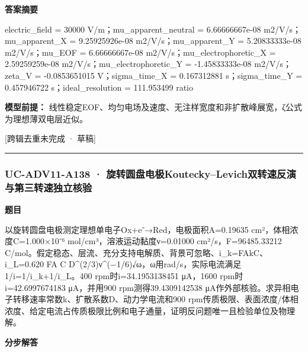 \documentclass[UTF8,11pt,a4paper]{ctexart}
\begin{document}
\noindent\textbf{答案摘要}\par
electric\_field = 30000 V/m；mu\_apparent\_neutral = 6.66666667e-08 m2/V/s；mu\_apparent\_X = 9.25925926e-08 m2/V/s；mu\_apparent\_Y = 5.20833333e-08 m2/V/s；mu\_EOF = 6.66666667e-08 m2/V/s；mu\_electrophoretic\_X = 2.59259259e-08 m2/V/s；mu\_electrophoretic\_Y = -1.45833333e-08 m2/V/s；zeta\_V = -0.0853651015 V；sigma\_time\_X = 0.167312881 s；sigma\_time\_Y = 0.457946722 s；ideal\_resolution = 111.953499 ratio\par
\noindent\textbf{模型前提：}
线性稳定EOF、均匀电场及速度、无注样宽度和非扩散峰展宽，ζ公式为理想薄双电层近似。\par
\noindent\textcolor{red!65!black}{[跨辑去重未完成 · 草稿]} \par
\medskip\hrule\medskip
{}
\subsubsection*{UC-ADV11-A138 · 旋转圆盘电极Koutecky–Levich双转速反演与第三转速独立核验}
\noindent\textbf{题目}\par
以旋转圆盘电极测定理想单电子Ox+e⁻→Red，电极面积A=0.19635 cm²，体相浓度C=1.000×10⁻⁶ mol/cm³，溶液运动黏度ν=0.01000 cm²/s，F=96485.33212 C/mol。假定稳态、层流、充分支持电解质、背景可忽略、i\_k=FAkC、i\_L=0.620 FA C D\textasciicircum{}(2/3)ν\textasciicircum{}(−1/6)√ω，ω用rad/s，实际电流满足1/i=1/i\_k+1/i\_L。400 rpm时i=34.1953138451 μA，1600 rpm时i=42.6997674183 μA，并用900 rpm测得39.4309142538 μA作外部核验。求异相电子转移速率常数k、扩散系数D、动力学电流和900 rpm传质极限、表面浓度/体相浓度、给定电流占传质极限比例和电子通量，证明反问题唯一且检验单位及物理解。\par
\medskip\noindent\textbf{分步解答}
\end{document}
